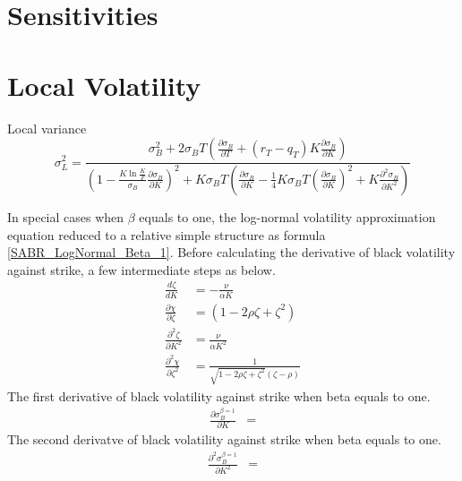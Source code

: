 \documentclass{article}
\begin{document}
\section{Sensitivities}



\section{Local Volatility}

Local variance
\begin{equation}
    \sigma_{L}^2 = \frac{\sigma_{B}^2 + 2 \sigma_{B} T \left(\frac{\partial \sigma_{B}}{\partial T} + (r_T - q_T) K \frac{\partial \sigma_{B}}{\partial K}\right)}{\left(1 - \frac{K \ln{\frac{K}{F}}}{\sigma_{B}} \frac{\partial \sigma_{B}}{\partial K}\right)^2 + K \sigma_{B} T \left(\frac{\partial \sigma_{B}}{\partial K} - \frac{1}{4} K \sigma_{B} T \left(\frac{\partial \sigma_{B}}{\partial K}\right)^2 + K \frac{\partial^2 \sigma_{B}}{\partial K^2}\right)}
\end{equation}

In special cases when $ \beta $ equals to one, the log-normal volatility approximation equation reduced to a relative simple structure as formula \ref{SABR_LogNormal_Beta_1}.
Before calculating the derivative of black volatility against strike, a few intermediate steps as below.
\begin{subequations}
    \begin{align}
        \frac{d \zeta}{d K} &= -\frac{\nu}{\alpha K} \\
        \frac{\partial \chi}{\partial \zeta} &= \left(1 - 2 \rho \zeta + \zeta^2\right)\\
        \frac{\partial^2 \zeta}{\partial K^2} &= \frac{\nu}{\alpha K^2}\\
        \frac{\partial^2 \chi}{\partial \zeta^2} &= \frac{1}{\sqrt{1 - 2 \rho \zeta + \zeta^2} \left(\zeta - \rho\right)}
    \end{align}
\end{subequations}
The first derivative of black volatility against strike when beta equals to one.
\begin{align} \label{dSigdK}
    \frac{\partial \sigma_{B}^{\beta=1}}{\partial K} &= 
\end{align}
The second derivatve of black volatility against strike when beta equals to one.
\begin{align} \label{dSig2dK2}
    \frac{\partial^2 \sigma_{B}^{\beta=1}}{\partial K^2} &=
\end{align}
\end{document}
